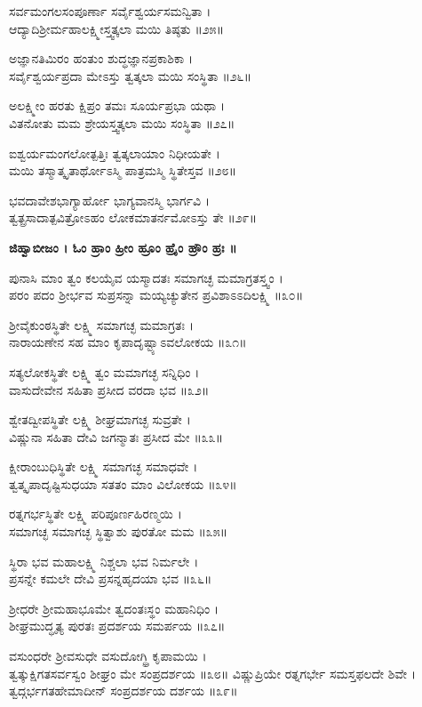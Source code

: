 	ಸರ್ವಮಂಗಲಸಂಪೂರ್ಣಾ ಸರ್ವೈಶ್ವರ್ಯಸಮನ್ವಿತಾ ।\\
	ಆದ್ಯಾದಿಶ್ರೀರ್ಮಹಾಲಕ್ಷ್ಮೀಸ್ತ್ವತ್ಕಲಾ ಮಯಿ ತಿಷ್ಠತು ॥೨೫॥

ಅಜ್ಞಾನತಿಮಿರಂ ಹಂತುಂ ಶುದ್ಧಜ್ಞಾನಪ್ರಕಾಶಿಕಾ ।\\
ಸರ್ವೈಶ್ವರ್ಯಪ್ರದಾ ಮೇಽಸ್ತು ತ್ವತ್ಕಲಾ ಮಯಿ ಸಂಸ್ಥಿತಾ ॥೨೬॥

	ಅಲಕ್ಷ್ಮೀಂ ಹರತು ಕ್ಷಿಪ್ರಂ ತಮಃ ಸೂರ್ಯಪ್ರಭಾ ಯಥಾ ।\\
	ವಿತನೋತು ಮಮ ಶ್ರೇಯಸ್ತ್ವತ್ಕಲಾ ಮಯಿ ಸಂಸ್ಥಿತಾ ॥೨೭॥

ಐಶ್ವರ್ಯಮಂಗಲೋತ್ಪತ್ತಿಃ ತ್ವತ್ಕಲಾಯಾಂ ನಿಧೀಯತೇ ।\\
ಮಯಿ ತಸ್ಮಾತ್ಕೃತಾರ್ಥೋಽಸ್ಮಿ ಪಾತ್ರಮಸ್ಮಿ ಸ್ಥಿತೇಸ್ತವ ॥೨೮॥

	ಭವದಾವೇಶಭಾಗ್ಯಾರ್ಹೋ ಭಾಗ್ಯವಾನಸ್ಮಿ ಭಾರ್ಗವಿ ।\\
	ತ್ವತ್ಪ್ರಸಾದಾತ್ಪವಿತ್ರೋಽಹಂ ಲೋಕಮಾತರ್ನಮೋಽಸ್ತು ತೇ ॥೨೯॥

{\bfseries ಜಿಹ್ವಾಬೀಜಂ । ಓಂ ಹ್ರಾಂ ಹ್ರೀಂ ಹ್ರೂಂ ಹ್ರೈಂ ಹ್ರೌಂ ಹ್ರಃ ॥}

ಪುನಾಸಿ ಮಾಂ ತ್ವಂ ಕಲಯೈವ ಯಸ್ಮಾದತಃ ಸಮಾಗಚ್ಛ ಮಮಾಗ್ರತಸ್ತ್ವಂ ।\\
ಪರಂ ಪದಂ ಶ್ರೀರ್ಭವ ಸುಪ್ರಸನ್ನಾ ಮಯ್ಯಚ್ಯುತೇನ ಪ್ರವಿಶಾಽಽದಿಲಕ್ಷ್ಮಿ ॥೩೦॥

	ಶ್ರೀವೈಕುಂಠಸ್ಥಿತೇ ಲಕ್ಷ್ಮಿ ಸಮಾಗಚ್ಛ ಮಮಾಗ್ರತಃ ।\\
	ನಾರಾಯಣೇನ ಸಹ ಮಾಂ ಕೃಪಾದೃಷ್ಟ್ಯಾಽವಲೋಕಯ ॥೩೧॥

	ಸತ್ಯಲೋಕಸ್ಥಿತೇ ಲಕ್ಷ್ಮಿ ತ್ವಂ ಮಮಾಗಚ್ಛ ಸನ್ನಿಧಿಂ ।\\
	ವಾಸುದೇವೇನ ಸಹಿತಾ ಪ್ರಸೀದ ವರದಾ ಭವ ॥೩೨॥

ಶ್ವೇತದ್ವೀಪಸ್ಥಿತೇ ಲಕ್ಷ್ಮಿ ಶೀಘ್ರಮಾಗಚ್ಛ ಸುವ್ರತೇ ।\\
ವಿಷ್ಣುನಾ ಸಹಿತಾ ದೇವಿ ಜಗನ್ಮಾತಃ ಪ್ರಸೀದ ಮೇ ॥೩೩॥

	ಕ್ಷೀರಾಂಬುಧಿಸ್ಥಿತೇ ಲಕ್ಷ್ಮಿ ಸಮಾಗಚ್ಛ ಸಮಾಧವೇ ।\\
	ತ್ವತ್ಕೃಪಾದೃಷ್ಟಿಸುಧಯಾ ಸತತಂ ಮಾಂ ವಿಲೋಕಯ ॥೩೪॥

ರತ್ನಗರ್ಭಸ್ಥಿತೇ ಲಕ್ಷ್ಮಿ ಪರಿಪೂರ್ಣಹಿರಣ್ಮಯಿ ।\\
ಸಮಾಗಚ್ಛ ಸಮಾಗಚ್ಛ ಸ್ಥಿತ್ವಾಶು ಪುರತೋ ಮಮ ॥೩೫॥

	ಸ್ಥಿರಾ ಭವ ಮಹಾಲಕ್ಷ್ಮಿ ನಿಶ್ಚಲಾ ಭವ ನಿರ್ಮಲೇ ।\\
	ಪ್ರಸನ್ನೇ ಕಮಲೇ ದೇವಿ ಪ್ರಸನ್ನಹೃದಯಾ ಭವ ॥೩೬॥

ಶ್ರೀಧರೇ ಶ್ರೀಮಹಾಭೂಮೇ ತ್ವದಂತಃಸ್ಥಂ ಮಹಾನಿಧಿಂ ।\\
ಶೀಘ್ರಮುದ್ಧೃತ್ಯ ಪುರತಃ ಪ್ರದರ್ಶಯ ಸಮರ್ಪಯ ॥೩೭॥

	ವಸುಂಧರೇ ಶ್ರೀವಸುಧೇ ವಸುದೋಗ್ಧ್ರಿ ಕೃಪಾಮಯಿ ।\\
	ತ್ವತ್ಕುಕ್ಷಿಗತಸರ್ವಸ್ವಂ ಶೀಘ್ರಂ ಮೇ ಸಂಪ್ರದರ್ಶಯ ॥೩೮॥
\newpage
ವಿಷ್ಣುಪ್ರಿಯೇ ರತ್ನಗರ್ಭೇ ಸಮಸ್ತಫಲದೇ ಶಿವೇ ।\\
ತ್ವದ್ಗರ್ಭಗತಹೇಮಾದೀನ್ ಸಂಪ್ರದರ್ಶಯ ದರ್ಶಯ ॥೩೯॥

